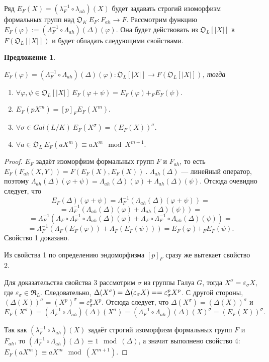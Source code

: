 \documentclass[a4paper]{article}
\newcommand{\OK}{\mathfrak{O}_K}
\newcommand{\OL}{\mathfrak{O}_L}
\newcommand{\RL}{\mathfrak{R}_L}
\newtheorem{proposition}{Предложение}
\begin{document}
Ряд $E_F(X)=(\lambda_F^{-1}\circ\lambda_{ah})(X)$ будет задавать строгий изоморфизм формальных групп над $\OK\ E_F: F_{ah} \rightarrow F$.
Рассмотрим функцию $E_F(\varphi):=(\Lambda_F^{-1}\circ\Lambda_{ah})(\Delta)(\varphi)$. Она будет действовать из $\OL[|X|]$ в $F(\OL[|X|])$ и будет обладать следующими свойствами.

\begin{proposition}\

$E_F(\varphi)=(\Lambda_F^{-1}\circ\Lambda_{ah})(\Delta)(\varphi):\OL[|X|]\rightarrow F(\OL[|X|])$, тогда

\begin{enumerate}
\item $\forall\varphi,\psi\in\OL[|X|]\ E_F(\varphi+\psi)=E_F(\varphi)+_FE_F(\psi).$
\item $E_F(pX^m)=[p]_FE_F(X^m).$
\item $\forall\sigma\in Gal(L/K)\ E_F(X^\sigma)=(E_F(X))^\sigma.$
\item $\forall a\in\OL\ E_F(aX^m)\equiv aX^m\mod X^{m+1}.$
\end{enumerate}
\end{proposition}
\begin{proof}
$E_F$ задаёт изоморфизм формальных групп $F$ и $F_{ah}$, то есть $E_F(F_{ah}(X,Y))=F(E_F(X),E_F(X))\ $. $\Lambda_{ah}(\Delta)$ --- линейный оператор, поэтому $\Lambda_{ah}(\Delta)(\varphi+\psi)=\Lambda_{ah}(\Delta)(\varphi)+\Lambda_{ah}(\Delta)(\psi)$. Отсюда очевидно следует, что
$$E_F(\Delta)(\varphi+\psi)=\Lambda_F^{-1}\left(\Lambda_{ah}(\Delta)(\varphi+\psi)\right)=$$
$$=\Lambda_F^{-1}\left(\Lambda_{ah}(\Delta)(\varphi)+\Lambda_{ah}(\Delta)(\psi)\right)=$$
$$=\Lambda_F^{-1}\left(\Lambda_F\circ\Lambda_F^{-1}\circ\Lambda_{ah}(\Delta)(\varphi)+\Lambda_F\circ\Lambda_F^{-1}\circ\Lambda_{ah}(\Delta)(\psi)\right)=$$
$$=\Lambda_F^{-1}\left(\Lambda_F(E_F(\varphi))+\Lambda_F(E_F(\psi))\right)=E_F(\varphi)+_FE_F(\psi).$$
Свойство 1 доказано.

Из свойства 1 по определению эндоморфизма $[p]_F$ сразу же вытекает свойство 2.

Для доказательства свойства 3 рассмотрим $\sigma$ из группы Галуа $G$, тогда $X^\sigma=\varepsilon_\sigma X$, где $\varepsilon_\sigma\in\RL$. Следовательно, $\Delta(X^\sigma)=\Delta(\varepsilon_\sigma X)=\linebreak=\varepsilon_\sigma^p X^p$. С другой стороны, $(\Delta(X))^\sigma=(X^p)^\sigma=\varepsilon_\sigma^pX^p$. Отсюда следует, что $\Delta(X^\sigma)=(\Delta(X))^\sigma$ и 
$$E_F(X^\sigma)=(\Lambda_F^{-1}\circ\Lambda_{ah})(\Delta)(X^\sigma)=(\Lambda_F^{-1}\circ\Lambda_{ah})(\Delta)(X)^\sigma=(E_F(X))^\sigma.$$

Так как $(\lambda_F^{-1}\circ\lambda_{ah})(X)$ задаёт строгий изоморфизм формальных групп $F$ и $F_{ah}$, то $(\Lambda_F^{-1}\circ\Lambda_{ah})(\Delta)\equiv1\mod(\Delta)$, а значит выполнено свойство 4: $E_F(aX^m)\equiv aX^m\mod(X^{m+1})$.
\end{proof}
\end{document}
